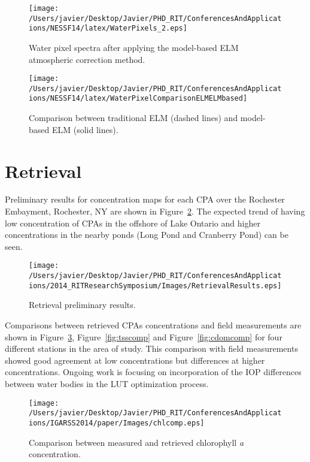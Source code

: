\begin{figure}[!ht]
  \begin{minipage}[c]{0.48\linewidth}
    \centering
      \texttt{[image: /Users/javier/Desktop/Javier/PHD\_RIT/ConferencesAndApplications/NESSF14/latex/WaterPixels\_2.eps]}
      \caption{Water pixel spectra after applying the model-based ELM atmospheric correction method.}
      \label{fig:waterpxs}
  \end{minipage}
  \hfill
  \begin{minipage}[d]{0.48\linewidth}
    \centering
      \texttt{[image: /Users/javier/Desktop/Javier/PHD\_RIT/ConferencesAndApplications/NESSF14/latex/WaterPixelComparisonELMELMbased]}
      \caption{Comparison between traditional ELM (dashed lines) and model-based ELM (solid lines).}
      \label{fig:refcomp}
  \end{minipage}
\end{figure}


\section{Retrieval}

Preliminary results for concentration maps for each CPA over the Rochester Embayment, Rochester, NY are shown in Figure~\ref{fig:retrievalresults}. The expected trend of having low concentration of CPAs in the offshore of Lake Ontario and higher concentrations in the nearby ponds (Long Pond and Cranberry Pond) can be seen. 
\begin{figure}[htb]
\centering
\texttt{[image: /Users/javier/Desktop/Javier/PHD\_RIT/ConferencesAndApplications/2014\_RITResearchSymposium/Images/RetrievalResults.eps]}
   \caption{Retrieval preliminary results.}
      \label{fig:retrievalresults}   
\end{figure}

Comparisons between retrieved CPAs concentrations and field measurements are shown in Figure~\ref{fig:chlcomp}, Figure~\ref{fig:tsscomp} and Figure~\ref{fig:cdomcomp} for four different stations in the area of study. This comparison with field measurements showed good agreement at low concentrations but differences at higher concentrations. Ongoing work is focusing on incorporation of the IOP differences between water bodies in the LUT optimization process.
\begin{figure}[htb]
\centering
    \texttt{[image: /Users/javier/Desktop/Javier/PHD\_RIT/ConferencesAndApplications/IGARSS2014/paper/Images/chlcomp.eps]} 
    \caption{Comparison between measured and retrieved chlorophyll {\it a} concentration.}
    \label{fig:chlcomp} 
\end{figure}     

